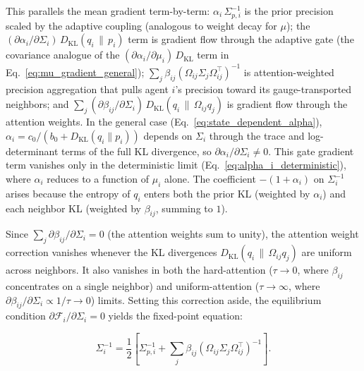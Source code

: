 \documentclass[twoside,11pt]{article}
\begin{document}
This parallels the mean gradient term-by-term: $\alpha_i\,\Sigma_{p,i}^{-1}$ is the prior precision scaled by the adaptive coupling (analogous to weight decay for $\mu$); the $(\partial\alpha_i/\partial\Sigma_i)\,D_{\mathrm{KL}}(q_i \,\|\, p_i)$ term is gradient flow through the adaptive gate (the covariance analogue of the $(\partial\alpha_i/\partial\mu_i)\,D_{\mathrm{KL}}$ term in Eq.~\ref{eq:mu_gradient_general}); $\sum_j \beta_{ij}(\Omega_{ij}\Sigma_j\Omega_{ij}^\top)^{-1}$ is attention-weighted precision aggregation that pulls agent $i$'s precision toward its gauge-transported neighbors; and $\sum_j (\partial \beta_{ij}/\partial \Sigma_i)\, D_{\mathrm{KL}}(q_i \,\|\, \Omega_{ij} q_j)$ is gradient flow through the attention weights. In the general case (Eq.~\ref{eq:state_dependent_alpha}), $\alpha_i = c_0/(b_0 + D_{\mathrm{KL}}(q_i \| p_i))$ depends on $\Sigma_i$ through the trace and log-determinant terms of the full KL divergence, so $\partial\alpha_i/\partial\Sigma_i \neq 0$. This gate gradient term vanishes only in the deterministic limit (Eq.~\ref{eq:alpha_i_deterministic}), where $\alpha_i$ reduces to a function of $\mu_i$ alone. The coefficient $-(1+\alpha_i)$ on $\Sigma_i^{-1}$ arises because the entropy of $q_i$ enters both the prior KL (weighted by $\alpha_i$) and each neighbor KL (weighted by $\beta_{ij}$, summing to $1$).

Since $\sum_j \partial \beta_{ij}/\partial \Sigma_i = 0$ (the attention weights sum to unity), the attention weight correction vanishes whenever the KL divergences $D_{\mathrm{KL}}(q_i \,\|\, \Omega_{ij}q_j)$ are uniform across neighbors. It also vanishes in both the hard-attention ($\tau \to 0$, where $\beta_{ij}$ concentrates on a single neighbor) and uniform-attention ($\tau \to \infty$, where $\partial\beta_{ij}/\partial\Sigma_i \propto 1/\tau \to 0$) limits. Setting this correction aside, the equilibrium condition $\partial \mathcal{F}_i / \partial \Sigma_i = 0$ yields the fixed-point equation:

\begin{equation}
\Sigma_i^{-1}
=\frac{1}{2}
\left[
\Sigma_{p,i}^{-1}
+ \sum_j \beta_{ij}
(\Omega_{ij}\Sigma_j\Omega_{ij}^\top)^{-1}
\right].
\label{eq:sigma_fixed_point_main}
\end{equation}
\end{document}
